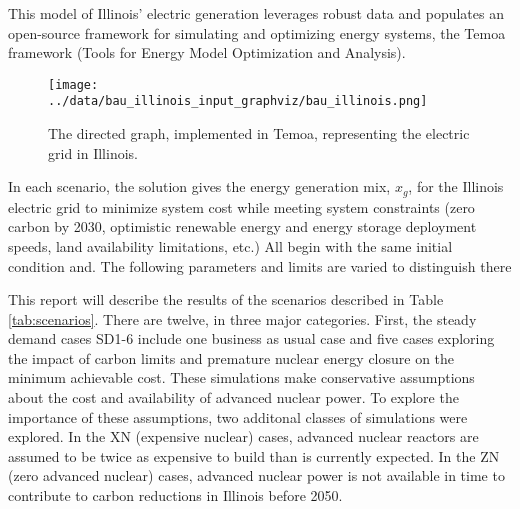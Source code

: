 This model of Illinois' electric generation leverages robust data and populates 
an open-source framework for simulating and optimizing energy systems, 
the Temoa framework (Tools for Energy Model Optimization and Analysis). 


\begin{wrapfigure}{l}{0.3\linewidth}
\begin{center}
\texttt{[image: ../data/bau\_illinois\_input\_graphviz/bau\_illinois.png]}
\end{center}
\caption{The directed graph, implemented in Temoa, representing the electric grid in Illinois.}
\label{fig:temoa_graph}
\end{wrapfigure}

In each scenario, the solution gives the energy generation mix, $x_g$,
for the Illinois electric grid to minimize system cost while meeting system
constraints (zero carbon by 2030, optimistic renewable energy and energy
storage deployment speeds, land availability limitations, etc.)
All begin with the same initial condition and. The following parameters and limits are varied to distinguish there

This report will describe the results of the scenarios described in Table \ref{tab:scenarios}. 
There are twelve, in three major categories. First, the steady demand cases SD1-6 include one business as usual case and five cases exploring the impact of carbon limits and premature nuclear energy closure on the minimum achievable cost. These simulations make conservative assumptions about the cost and availability of advanced nuclear power. To explore the importance of these assumptions, two additonal classes of simulations were explored. In the XN (expensive nuclear) cases, advanced nuclear reactors are assumed to be twice as expensive to build than is currently expected. In the ZN (zero advanced nuclear) cases, advanced nuclear power is not available in time to contribute to carbon reductions in Illinois before 2050.  

